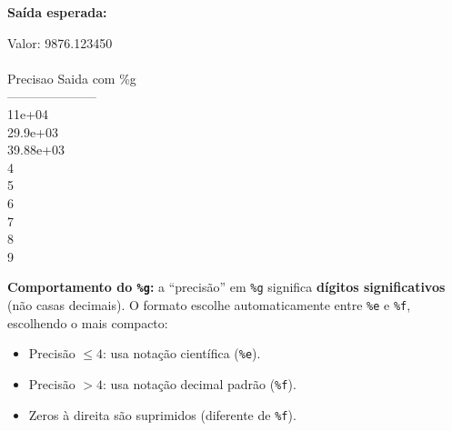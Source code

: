 \documentclass[12pt,a4paper]{article}
\begin{document}
\begin{respostabox}
\textbf{Saída esperada:}
\begin{saida}
Valor: 9876.123450\\
\\
Precisao  Saida com \%g\\
---------------------\\
1\textvisiblespace\textvisiblespace\textvisiblespace\textvisiblespace\textvisiblespace\textvisiblespace\textvisiblespace\textvisiblespace\textvisiblespace 1e+04\\
2\textvisiblespace\textvisiblespace\textvisiblespace\textvisiblespace\textvisiblespace\textvisiblespace\textvisiblespace\textvisiblespace\textvisiblespace 9.9e+03\\
3\textvisiblespace\textvisiblespace\textvisiblespace\textvisiblespace\textvisiblespace\textvisiblespace\textvisiblespace\textvisiblespace\textvisiblespace 9.88e+03\\
4\textvisiblespace\textvisiblespace\textvisiblespace\textvisiblespace\textvisiblespace\textvisiblespace\textvisiblespace\textvisiblespace{}\\
5\textvisiblespace\textvisiblespace\textvisiblespace\textvisiblespace\textvisiblespace\textvisiblespace\textvisiblespace\textvisiblespace{}\\
6\textvisiblespace\textvisiblespace\textvisiblespace\textvisiblespace\textvisiblespace\textvisiblespace\textvisiblespace\textvisiblespace{}\\
7\textvisiblespace\textvisiblespace\textvisiblespace\textvisiblespace\textvisiblespace\textvisiblespace\textvisiblespace\textvisiblespace{}\\
8\textvisiblespace\textvisiblespace\textvisiblespace\textvisiblespace\textvisiblespace\textvisiblespace\textvisiblespace\textvisiblespace{}\\
9\textvisiblespace\textvisiblespace\textvisiblespace\textvisiblespace\textvisiblespace\textvisiblespace\textvisiblespace\textvisiblespace{}
\end{saida}

\textbf{Comportamento do \texttt{\%g}:} a ``precisão'' em \texttt{\%g} significa
\textbf{dígitos significativos} (não casas decimais). O formato escolhe
automaticamente entre \texttt{\%e} e \texttt{\%f}, escolhendo o mais compacto:
\begin{itemize}[noitemsep]
  \item Precisão $\leq 4$: usa notação científica (\texttt{\%e}).
  \item Precisão $> 4$: usa notação decimal padrão (\texttt{\%f}).
  \item Zeros à direita são suprimidos (diferente de \texttt{\%f}).
\end{itemize}


\end{respostabox}
\end{document}
